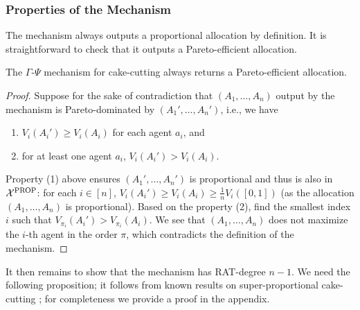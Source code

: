 \subsubsection{Properties of the Mechanism}
The mechanism always outputs a proportional allocation by definition.
It is straightforward to check that it outputs a Pareto-efficient allocation.
\begin{propositionrep}
The $\Gamma$-$\Psi$ mechanism for cake-cutting always returns a Pareto-efficient allocation.
\end{propositionrep}
\begin{proof}
Suppose for the sake of contradiction that $(A_1,\ldots,A_n)$ output by the mechanism is Pareto-dominated by $(A_1',\ldots,A_n')$, i.e., we have
\begin{enumerate}
    \item $V_i(A_i')\geq V_i(A_i)$ for each agent $a_i$, and
    \item for at least one agent $a_i$, $V_i(A_i')> V_i(A_i)$.
\end{enumerate}
Property (1) above ensures $(A_1',\ldots,A_n')$ is proportional and thus is also in $\mathcal{X}^{\mathrm{PROP}}$: for each $i\in[n]$, $V_i(A_i')\geq V_i(A_i)\geq \frac1nV_i([0,1])$ (as the allocation $(A_1,\ldots,A_n)$ is proportional).
Based on the property (2), find the smallest index $i$ such that $V_{\pi_i}(A_i')>V_{\pi_i}(A_i)$.
We see that $(A_1,\ldots,A_n)$ does not maximize the $i$-th agent in the order $\pi$, which contradicts the definition of the mechanism.
\end{proof}

It then remains to show that the mechanism has RAT-degree $n-1$.
We need the following proposition; it follows from known results on super-proportional cake-cutting \citep{dubins1961cut,woodall1986note}; for completeness we provide a proof in the appendix.

